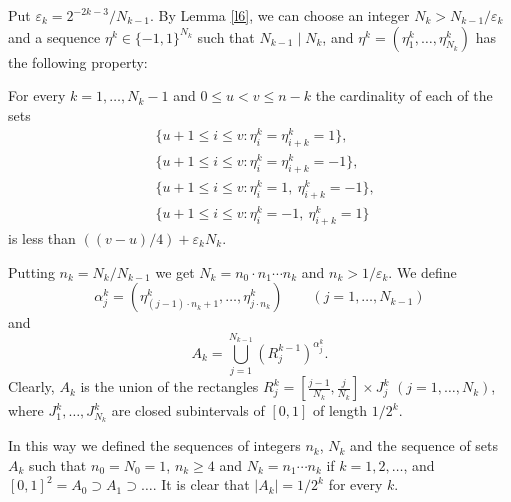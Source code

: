 \documentclass[12pt]{article}
\def\sp{\supset}
\def\al{\alpha}
\def\ep{\varepsilon}
\def\cd{\cdot}
\def\stb{,\ldots ,}
\def\nl{[0,1]}
\begin{document}
Put $\ep _k = 2^{-2k-3}/N_{k-1}$. By Lemma \ref{l6}, we can choose an integer
$N_k > N_{k-1} /\ep _k$ and a sequence $\eta ^k \in \{ -1 ,1\}^{N_k}$ such
that $N_{k-1} \mid N_k$, and $\eta ^k =(\eta ^k_1 \stb \eta ^k_{N_k} )$
has the following property:

For every $k=1\stb N_k -1$ and
$0\le u<v\le n-k$ the cardinality of each of the sets
\begin{equation}\label{e6}
\begin{split}  
 &\{ u+1\le i \le v \colon \eta^k _i =\eta^k _{i+k} =1\} ,\\
 &\{ u+1\le i \le v \colon \eta^k _i =\eta^k _{i+k} =-1\},\\
 &\{ u+1\le i \le v \colon \eta^k _i =1, \ \eta^k_{i+k} =-1\},\\
 &\{ u+1\le i \le v \colon \eta^k_i =-1, \ \eta^k _{i+k} =1\}
\end{split}
\end{equation}
is less than $((v-u)/4) +\ep_k N_k$.

Putting $n_k =N_k /N_{k-1}$ we get $N_k =n_0 \cd n_1 \cdots n_k$ and $n_k >
1/\ep _k$. We define 
$$\al ^k_j = (\eta ^k_{(j-1)\cd n_k +1} \stb \eta ^k_{j\cd n_k}) \qquad
(j=1\stb N_{k-1} )$$
and
$$A_k= \bigcup_{j=1}^{N_{k-1}} \left( R^{k-1} _j \right) ^{\al ^k_j} .$$
Clearly, $A_k$ is the union of the rectangles $R^k_j =\left[
\tfrac{j-1}{N_k},\tfrac{j}{N_k} \right] \times J^k_j$
$(j=1\stb N_k )$, where $J^k_1 \stb J^k_{N_k}$ are closed subintervals
of $\nl$ of length $1/2^k$.

In this way we defined the sequences of integers $n_k$, $N_k$ and the 
sequence of sets $A_k$ such that $n_0 =N_0 =1$, $n_k \ge 4$ and $N_k =
n_1\cdots n_k$ if $k=1,2,\ldots$, and $\nl ^2 =A_0 \sp A_1 \sp \ldots$. It
is clear that $|A_k |=1/2^k$ for every $k$.
\end{document}
